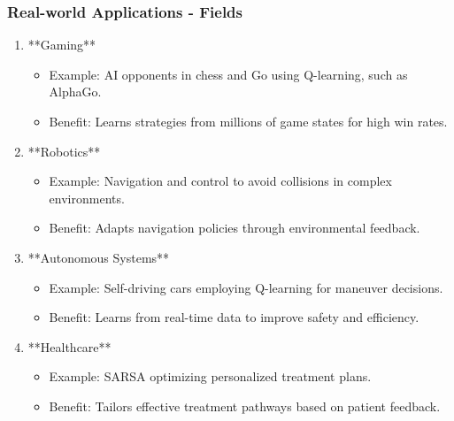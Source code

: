 \documentclass[aspectratio=169]{beamer}
\begin{document}
\begin{frame}
    \frametitle{Real-world Applications - Fields}
    \begin{enumerate}
        \item **Gaming**
            \begin{itemize}
                \item Example: AI opponents in chess and Go using Q-learning, such as AlphaGo.
                \item Benefit: Learns strategies from millions of game states for high win rates.
            \end{itemize}
        \item **Robotics**
            \begin{itemize}
                \item Example: Navigation and control to avoid collisions in complex environments.
                \item Benefit: Adapts navigation policies through environmental feedback.
            \end{itemize}
        \item **Autonomous Systems**
            \begin{itemize}
                \item Example: Self-driving cars employing Q-learning for maneuver decisions.
                \item Benefit: Learns from real-time data to improve safety and efficiency.
            \end{itemize}
        \item **Healthcare**
            \begin{itemize}
                \item Example: SARSA optimizing personalized treatment plans.
                \item Benefit: Tailors effective treatment pathways based on patient feedback.
            \end{itemize}
    \end{enumerate}
\end{frame}
\end{document}
